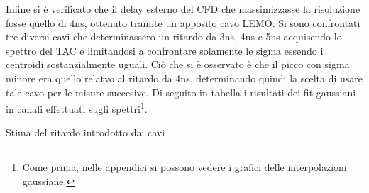 Infine si è verificato che il delay esterno del CFD che massimizzasse la risoluzione fosse quello di 4ns, ottenuto tramite un apposito cavo LEMO. Si sono confrontati tre diversi cavi
che determinassero un ritardo da 3ns, 4ns e 5ns acquisendo lo spettro del TAC e limitandosi a confrontare solamente le sigma essendo i centroidi sostanzialmente uguali. Ciò che si 
è osservato è che il picco con sigma minore era quello relatvo al ritardo da 4ns, determinando quindi la scelta di usare tale cavo per le misure succesive. Di seguito in tabella
i risultati dei fit gaussiani in canali effettuati sugli spettri\footnote{Come prima, nelle appendici si possono vedere i grafici delle interpolazioni gaussiane.}. \\

\begin{table}[h]
	\centering
	
	\caption{Stima del ritardo introdotto dai cavi}
	\label{tab:calib_walkcross}
\end{table}



